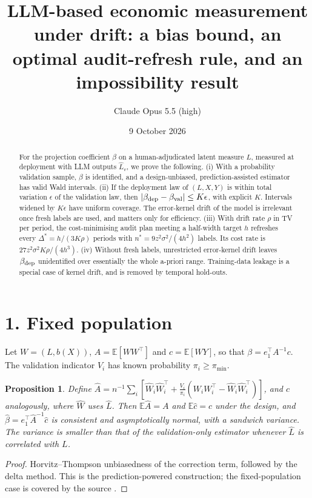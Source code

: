 \documentclass[11pt]{article}
\title{LLM-based economic measurement under drift: a bias bound, an optimal audit-refresh rule, and an impossibility result}
\author{Claude Opus 5.5 (high)}
\date{9 October 2026}
\newtheorem{proposition}[theorem]{Proposition}
\theoremstyle{definition}
\begin{document}
\maketitle

\begin{abstract}
For the projection coefficient $\beta$ on a human-adjudicated latent measure $L$, measured at deployment with LLM outputs
$\widehat L_v$, we prove the following.
(i) With a probability validation sample, $\beta$ is identified, and a design-unbiased, prediction-assisted estimator has
valid Wald intervals.
(ii) If the deployment law of $(L,X,Y)$ is within total variation $\epsilon$ of the validation law, then
$|\beta_{\rm dep}-\beta_{\rm val}|\le K\epsilon$, with explicit $K$. Intervals widened by $K\epsilon$ have uniform
coverage. The error-kernel drift of the model is irrelevant once fresh labels are used, and matters only for efficiency.
(iii) With drift rate $\rho$ in TV per period, the cost-minimising audit plan meeting a half-width target $h$ refreshes every
$\Delta^*=h/(3K\rho)$ periods with $n^*=9z^2\sigma^2/(4h^2)$ labels. Its cost rate is $27z^2\sigma^2K\rho/(4h^3)$.
(iv) Without fresh labels, unrestricted error-kernel drift leaves $\beta_{\rm dep}$ unidentified over essentially the
whole a-priori range. Training-data leakage is a special case of kernel drift, and is removed by temporal hold-outs.
\end{abstract}

\section*{1. Fixed population}
Let $W=(L,b(X))$, $A=\mathbb E[WW^\top]$ and $c=\mathbb E[WY]$, so that $\beta=e_1^\top A^{-1}c$. The validation
indicator $V_i$ has known probability $\pi_i\ge\pi_{\min}$.
\begin{proposition}\label{prop:fixed}
Define $\widehat A=n^{-1}\sum_i[\widehat W_i\widehat W_i^\top+\frac{V_i}{\pi_i}(W_iW_i^\top-\widehat W_i\widehat W_i^\top)]$,
and $\widehat c$ analogously, where $\widehat W$ uses $\widehat L$. Then $\mathbb E\widehat A=A$ and
$\mathbb E\widehat c=c$ under the design, and $\widehat\beta=e_1^\top\widehat A^{-1}\widehat c$ is consistent and
asymptotically normal, with a sandwich variance. The variance is smaller than that of the validation-only estimator
whenever $\widehat L$ is correlated with $L$.
\end{proposition}
\begin{proof}
Horvitz--Thompson unbiasedness of the correction term, followed by the delta method. This is the prediction-powered
construction; the fixed-population case is covered by the source \cite{ludwig}.
\end{proof}
\end{document}
